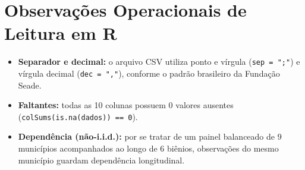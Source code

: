 \documentclass[11pt,a4paper]{article}
\begin{document}
\section*{Observações Operacionais de Leitura em R}
\begin{itemize}
  \item \textbf{Separador e decimal:} o arquivo CSV utiliza ponto e vírgula (\texttt{sep = ";"}) e vírgula decimal (\texttt{dec = ","}), conforme o padrão brasileiro da Fundação Seade.
  \item \textbf{Faltantes:} todas as 10 colunas possuem $0$ valores ausentes (\texttt{colSums(is.na(dados)) == 0}).
  \item \textbf{Dependência (não-i.i.d.):} por se tratar de um painel balanceado de 9 municípios acompanhados ao longo de 6 biênios, observações do mesmo município guardam dependência longitudinal.
\end{itemize}
\end{document}
